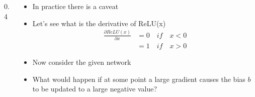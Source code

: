 
\begin{frame}
	\begin{columns}
		\begin{column} {0.4\textwidth}
			\begin{center}
				
			\end{center}
		\end{column}
		\begin{column}{0.6\textwidth}
			\begin{itemize}
				\justifying
				\item<1-> In practice there is a caveat
				\item<2-> Let's see what is the derivative of ReLU(x)\\
				\begin{align*}
					\frac{\partial ReLU(x)}{\partial x} & = 0 \quad {if \quad x < 0} \\
					                                    & = 1 \quad {if \quad x > 0} 
				\end{align*}
				

				\item<3-> Now consider the given network 
				\item<4-> What would happen if at some point a large gradient causes the bias $b$ to be updated to a large negative value?
			\end{itemize}
			
		\end{column}
		
	\end{columns}
\end{frame}


